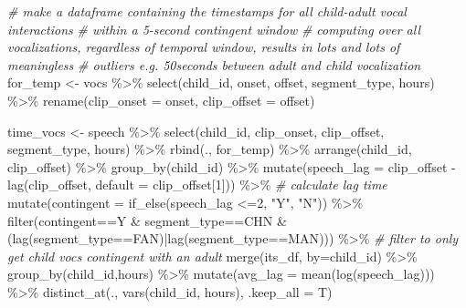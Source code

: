 \documentclass[
]{article}
\newenvironment{Shaded}{\begin{snugshade}}{\end{snugshade}}
\newcommand{\AttributeTok}[1]{\textcolor[rgb]{0.77,0.63,0.00}{#1}}
\newcommand{\CommentTok}[1]{\textcolor[rgb]{0.56,0.35,0.01}{\textit{#1}}}
\newcommand{\DecValTok}[1]{\textcolor[rgb]{0.00,0.00,0.81}{#1}}
\newcommand{\FunctionTok}[1]{\textcolor[rgb]{0.00,0.00,0.00}{#1}}
\newcommand{\NormalTok}[1]{#1}
\newcommand{\OtherTok}[1]{\textcolor[rgb]{0.56,0.35,0.01}{#1}}
\newcommand{\SpecialCharTok}[1]{\textcolor[rgb]{0.00,0.00,0.00}{#1}}
\newcommand{\StringTok}[1]{\textcolor[rgb]{0.31,0.60,0.02}{#1}}
\begin{document}
\begin{Shaded}
\begin{Highlighting}[]
\CommentTok{\# make a dataframe containing the timestamps for all child{-}adult vocal interactions}
\CommentTok{\# within a 5{-}second \textquotesingle{}contingent\textquotesingle{} window}
\CommentTok{\# computing over all vocalizations, regardless of temporal window, results in lots and lots of meaningless}
\CommentTok{\# outliers e.g. 50seconds between adult and child vocalization }
\NormalTok{for\_temp }\OtherTok{\textless{}{-}}\NormalTok{ vocs }\SpecialCharTok{\%\textgreater{}\%} 
  \FunctionTok{select}\NormalTok{(child\_id, onset, offset, segment\_type, hours) }\SpecialCharTok{\%\textgreater{}\%}
  \FunctionTok{rename}\NormalTok{(}\AttributeTok{clip\_onset =}\NormalTok{ onset,}
         \AttributeTok{clip\_offset =}\NormalTok{ offset)}

\NormalTok{time\_vocs }\OtherTok{\textless{}{-}}\NormalTok{ speech }\SpecialCharTok{\%\textgreater{}\%}
  \FunctionTok{select}\NormalTok{(child\_id, clip\_onset, clip\_offset, segment\_type, hours) }\SpecialCharTok{\%\textgreater{}\%}
  \FunctionTok{rbind}\NormalTok{(., for\_temp) }\SpecialCharTok{\%\textgreater{}\%}
  \FunctionTok{arrange}\NormalTok{(child\_id, clip\_offset) }\SpecialCharTok{\%\textgreater{}\%}
  \FunctionTok{group\_by}\NormalTok{(child\_id) }\SpecialCharTok{\%\textgreater{}\%}
  \FunctionTok{mutate}\NormalTok{(}\AttributeTok{speech\_lag =}\NormalTok{ clip\_offset }\SpecialCharTok{{-}} \FunctionTok{lag}\NormalTok{(clip\_offset, }\AttributeTok{default =}\NormalTok{ clip\_offset[}\DecValTok{1}\NormalTok{])) }\SpecialCharTok{\%\textgreater{}\%} \CommentTok{\# calculate lag time}
  \FunctionTok{mutate}\NormalTok{(}\AttributeTok{contingent =} \FunctionTok{if\_else}\NormalTok{(speech\_lag }\SpecialCharTok{\textless{}=}\DecValTok{2}\NormalTok{, }\StringTok{"Y"}\NormalTok{, }\StringTok{"N"}\NormalTok{)) }\SpecialCharTok{\%\textgreater{}\%}
  \FunctionTok{filter}\NormalTok{(contingent}\SpecialCharTok{==}\StringTok{\textquotesingle{}Y\textquotesingle{}} \SpecialCharTok{\&}\NormalTok{ segment\_type}\SpecialCharTok{==}\StringTok{\textquotesingle{}CHN\textquotesingle{}} \SpecialCharTok{\&}\NormalTok{ (}\FunctionTok{lag}\NormalTok{(segment\_type}\SpecialCharTok{==}\StringTok{\textquotesingle{}FAN\textquotesingle{}}\NormalTok{)}\SpecialCharTok{|}\FunctionTok{lag}\NormalTok{(segment\_type}\SpecialCharTok{==}\StringTok{\textquotesingle{}MAN\textquotesingle{}}\NormalTok{))) }\SpecialCharTok{\%\textgreater{}\%} \CommentTok{\# filter to only get child vocs contingent with an adult}
  \FunctionTok{merge}\NormalTok{(its\_df, }\AttributeTok{by=}\StringTok{\textquotesingle{}child\_id\textquotesingle{}}\NormalTok{) }\SpecialCharTok{\%\textgreater{}\%}
  \FunctionTok{group\_by}\NormalTok{(child\_id,hours) }\SpecialCharTok{\%\textgreater{}\%}
  \FunctionTok{mutate}\NormalTok{(}\AttributeTok{avg\_lag =} \FunctionTok{mean}\NormalTok{(}\FunctionTok{log}\NormalTok{(speech\_lag))) }\SpecialCharTok{\%\textgreater{}\%}
  \FunctionTok{distinct\_at}\NormalTok{(., }\FunctionTok{vars}\NormalTok{(child\_id, hours), }\AttributeTok{.keep\_all =}\NormalTok{ T)}


\end{Highlighting}
\end{Shaded}
\end{document}
